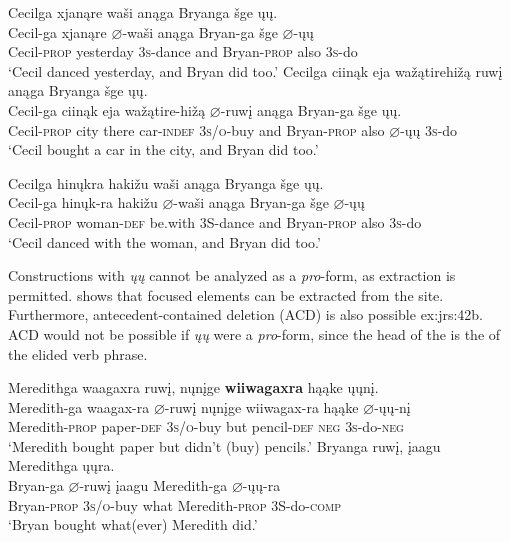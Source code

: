 \documentclass[output=paper]{LSP/langsci}
\begin{document}
\begin{exe}
\ex\label{ex:jrs:41}
\begin{xlist}
\ex 
\glll Cecilga 			xjanąre		wa\v{s}i anąga	Bryanga			\v{s}ge  	\k{u}\k{u}.\\
Cecil-ga			xjanąre		$\varnothing$-wa\v{s}i		anąga	Bryan-ga			\v{s}ge		$\varnothing$-\k{u}\k{u} \\
	Cecil-\textsc{prop}		yesterday	\textsc{3s}-dance	and			Bryan-\textsc{prop}	also	\textsc{3s}-do \\
\trans `Cecil danced yesterday, and Bryan did too.'
\ex 
\glll Cecilga 			ciinąk	eja		wa\v{z}ątirehi\v{z}ą		ruw\k{i}	anąga	Bryanga			\v{s}ge  \k{u}\k{u}. \\
Cecil-ga			ciinąk	eja		wa\v{z}ątire-hi\v{z}ą	$\varnothing$-ruw\k{i}			anąga	Bryan-ga	\v{s}ge \k{u}\k{u}. \\
Cecil-\textsc{prop}	city there	car-\textsc{indef}	\textsc{3s/o}-buy and Bryan-\textsc{prop}	also $\varnothing$-\k{u}\k{u} \textsc{3s}-do \\
\trans `Cecil bought a car in the city, and Bryan did too.'

\ex 
\glll Cecilga 		hin\k{u}kra	haki\v{z}u		wa\v{s}i		anąga	Bryanga			\v{s}ge		\k{u}\k{u}.\\
Cecil-ga		hin\k{u}k-ra	haki\v{z}u		$\varnothing$-wa\v{s}i		anąga	Bryan-ga	\v{s}ge		$\varnothing$-\k{u}\k{u} \\	Cecil-\textsc{prop}		woman-\textsc{def} 	be.with		3S-dance	and			Bryan-\textsc{prop}	also	\textsc{3s}-do \\
\trans `Cecil danced with the woman, and Bryan did too.'
\end{xlist}
\end{exe}

Constructions with \textit{\k{u}\k{u}} cannot be analyzed as a \textit{pro}-form, as  extraction is permitted.  shows that focused elements can be extracted from the  site. Furthermore, antecedent-contained deletion (ACD) is also possible {ex:jrs:42b}. ACD would not be possible if \textit{\k{u}\k{u}} were a \textit{pro}-form, since the head of the  is the  of the elided verb phrase.

\ea\label{ex:jrs:42}
\ea \label{ex:jrs:42a}
\glll Meredithga		waagaxra	ruw\k{i},		n\k{u}n\k{i}ge		\textbf{wiiwagaxra}	hąąke	\k{u}\k{u}n\k{i}.\\
Meredith-ga  waagax-ra	 $\varnothing$-ruw\k{i} 	n\k{u}n\k{i}ge		wiiwagax-ra	hąąke $\varnothing$-\k{u}\k{u}-n\k{i}\\
Meredith-\textsc{prop}	paper-\textsc{def}	\textsc{3s/o}-buy	but pencil-\textsc{def} \textsc{neg}	 \textsc{3s}-do-\textsc{neg}\\
\trans `Meredith bought paper but didn't (buy) pencils.'
\ex \label{ex:jrs:42b}
\glll  Bryanga			ruw\k{i},				\k{i}aagu		Meredithga			\k{u}\k{u}ra.\\
Bryan-ga			$\varnothing$-ruw\k{i}	\k{i}aagu		Meredith-ga	$\varnothing$-\k{u}\k{u}-ra\\
	Bryan-\textsc{prop}	\textsc{3s/o}-buy		what		Meredith-\textsc{prop}		3S-do-\textsc{comp}\\
\trans `Bryan bought what(ever) Meredith did.'
\z
\z
\end{document}
